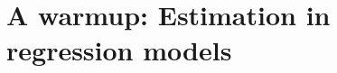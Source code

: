 \documentclass[10pt]{beamer}
\begin{document}
  
  \section{A warmup: Estimation in regression models}
  
  
\end{document}
